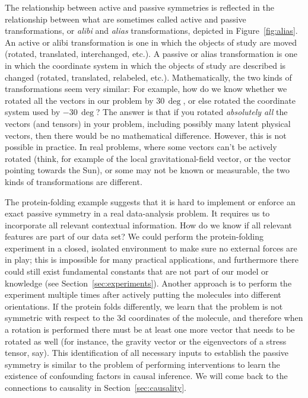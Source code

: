 \documentclass[preprint]{article} %
\newcommand{\sectionname}{Section}
\newcommand{\secref}[1]{\sectionname~\ref{#1}}
\newcommand{\figref}[1]{Figure~\ref{#1}}
\begin{document}
The relationship between active and passive symmetries is reflected in the relationship between what are sometimes called active and passive transformations, or \emph{alibi} and \emph{alias} transformations, depicted in \figref{fig:alias}.
An active or alibi transformation is one in which the objects of study are moved (rotated, translated, interchanged, etc.).
A passive or alias transformation is one in which the coordinate system in which the objects of study are described is changed (rotated, translated, relabeled, etc.).
Mathematically, the two kinds of transformations seem very similar:
For example, how do we know whether we rotated all the vectors in our problem by $30\,\deg$, or else rotated the coordinate system used by $-30\,\deg$?
The answer is that if you rotated \emph{absolutely all} the vectors (and tensors) in your problem, including possibly many latent physical vectors, then there would be no mathematical difference. However, this is not possible in practice. 
In real problems, where some vectors can't be actively rotated (think, for example of the local gravitational-field vector, or the vector pointing towards the Sun), or some may not be known or measurable, the two kinds of transformations are different.

The protein-folding example suggests that it is hard to implement or enforce an exact passive symmetry in a real data-analysis problem.
It requires us to incorporate all relevant contextual information.
How do we know if all relevant features are part of our data set?
We could perform the protein-folding experiment in a closed, isolated environment to make sure no external forces are in play;
this is impossible for many practical applications, and furthermore there could still exist fundamental constants that are not part of our model or knowledge (see \secref{sec:experiments}).
Another approach is to perform the experiment multiple times after actively putting the molecules into different orientations.
If the protein folds differently, we learn that the problem is not symmetric with respect to the 3d coordinates of the molecule, and therefore when a rotation is performed there must be at least one more vector that needs to be rotated as well (for instance, the gravity vector or the eigenvectors of a stress tensor, say).
This identification of all necessary inputs to establish the passive symmetry is similar to the problem of performing interventions to learn the existence of confounding factors in causal inference.
We will come back to the connections to causality in \secref{sec:causality}.
\end{document}
